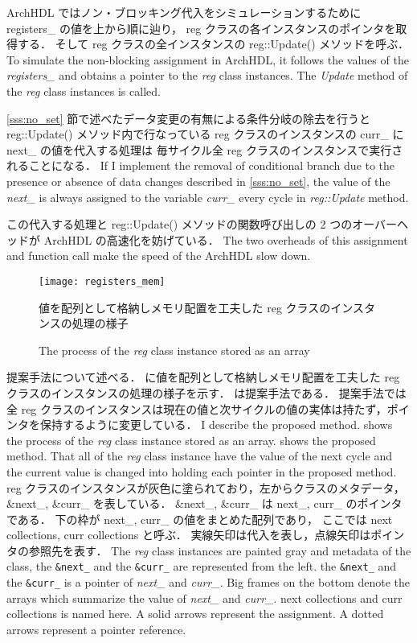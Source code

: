 ArchHDL ではノン・ブロッキング代入をシミュレーションするために registers\_ の値を上から順に辿り，
reg クラスの各インスタンスのポインタを取得する．
そして reg クラスの全インスタンスの reg::Update() メソッドを呼ぶ．
\fi
To simulate the non-blocking assignment in ArchHDL,
it follows the values of the \textit{registers\_}
and obtains a pointer to the \textit{reg} class instances.
The \textit{Update} method of the \textit{reg} class instances is called.

\ref{sss:no_set} 節で述べたデータ変更の有無による条件分岐の除去を行うと reg::Update() メソッド内で行なっている
reg クラスのインスタンスの curr\_ に next\_ の値を代入する処理は
毎サイクル全 reg クラスのインスタンスで実行されることになる．
\fi
If I implement the removal of conditional branch due to the presence or absence of data changes described in \ref{sss:no_set},
the value of the \textit{next\_} is always assigned to the variable \textit{curr\_} every cycle in \textit{reg::Update} method.

この代入する処理と reg::Update() メソッドの関数呼び出しの 2 つのオーバーヘッドが ArchHDL の高速化を妨げている．
\fi
The two overheads of this assignment and function call make the speed of the ArchHDL slow down.

\begin{figure}[t]
 \centering
 \texttt{[image: registers\_mem]}
 \caption{値を配列として格納しメモリ配置を工夫した reg クラスのインスタンスの処理の様子}
\fi
 \caption{The process of the \textit{reg} class instance stored as an array}
 \label{fig:mem_copy}
\end{figure}

提案手法について述べる．
 に値を配列として格納しメモリ配置を工夫した reg クラスのインスタンスの処理の様子を示す．
 は提案手法である．
提案手法では全 reg クラスのインスタンスは現在の値と次サイクルの値の実体は持たず，ポインタを保持するように変更している．
\fi
I describe the proposed method.
 shows the process of the \textit{reg} class instance stored as an array.
 shows the proposed method.
That all of the \textit{reg} class instance have the value of the next cycle and the current value is changed into holding each pointer in the proposed method.
reg クラスのインスタンスが灰色に塗られており，左からクラスのメタデータ，\&next\_, \&curr\_ を表している．
\&next\_, \&curr\_ は next\_, curr\_ のポインタである．
下の枠が next\_, curr\_ の値をまとめた配列であり，
ここでは next collections, curr collections と呼ぶ．
実線矢印は代入を表し，点線矢印はポインタの参照先を表す．
\fi
The \textit{reg} class instances are painted gray
and metadata of the class, the \texttt{\&next\_} and the \texttt{\&curr\_} are represented from the left.
the \texttt{\&next\_} and the \texttt{\&curr\_} is a pointer of \textit{next\_} and \textit{curr\_}.
Big frames on the bottom denote the arrays which summarize the value of \textit{next\_} and \textit{curr\_}.
next collections and curr collections is named here.
A solid arrows represent the assignment.
A dotted arrows represent a pointer reference.


